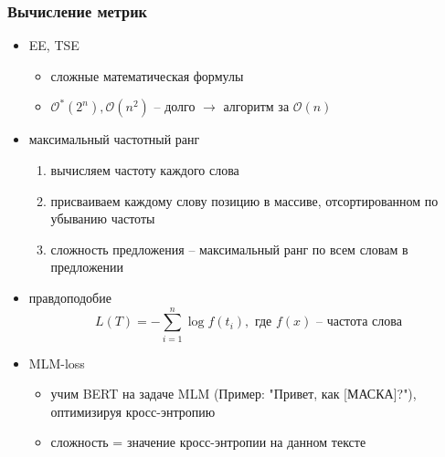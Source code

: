 \documentclass{beamer}
\begin{document}
\begin{frame}
	\frametitle{Вычисление метрик}
	\begin{itemize}
		\item EE, TSE
			\begin{itemize}
				\item сложные математическая формулы
				\item $\mathcal{O^*}(2^n), \mathcal{O}(n^2)$ -- долго $\rightarrow$ алгоритм за $\mathcal{O}(n)$
			\end{itemize}
		\item максимальный частотный ранг
			\begin{enumerate}
				\item вычисляем частоту каждого слова
				\item присваиваем каждому слову позицию в массиве, отсортированном по убыванию частоты
				\item сложность предложения -- максимальный ранг по всем словам в предложении
			\end{enumerate}
		\item правдоподобие
			\[
				L(T) = -\sum\limits_{i=1}^{n}\log f(t_i), \text{ где } f(x) \text{ -- частота слова}
			\]
		\item MLM-loss
			\begin{itemize}
				\item учим BERT на задаче MLM (Пример: "Привет, как [МАСКА]?"), оптимизируя кросс-энтропию
				\item сложность = значение кросс-энтропии на данном тексте
			\end{itemize}
	\end{itemize}
\end{frame}
\end{document}
